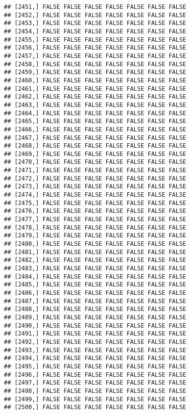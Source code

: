 \documentclass[
]{article}
\begin{document}
\begin{verbatim}
## [2451,] FALSE FALSE FALSE FALSE FALSE FALSE FALSE
## [2452,] FALSE FALSE FALSE FALSE FALSE FALSE FALSE
## [2453,] FALSE FALSE FALSE FALSE FALSE FALSE FALSE
## [2454,] FALSE FALSE FALSE FALSE FALSE FALSE FALSE
## [2455,] FALSE FALSE FALSE FALSE FALSE FALSE FALSE
## [2456,] FALSE FALSE FALSE FALSE FALSE FALSE FALSE
## [2457,] FALSE FALSE FALSE FALSE FALSE FALSE FALSE
## [2458,] FALSE FALSE FALSE FALSE FALSE FALSE FALSE
## [2459,] FALSE FALSE FALSE FALSE FALSE FALSE FALSE
## [2460,] FALSE FALSE FALSE FALSE FALSE FALSE FALSE
## [2461,] FALSE FALSE FALSE FALSE FALSE FALSE FALSE
## [2462,] FALSE FALSE FALSE FALSE FALSE FALSE FALSE
## [2463,] FALSE FALSE FALSE FALSE FALSE FALSE FALSE
## [2464,] FALSE FALSE FALSE FALSE FALSE FALSE FALSE
## [2465,] FALSE FALSE FALSE FALSE FALSE FALSE FALSE
## [2466,] FALSE FALSE FALSE FALSE FALSE FALSE FALSE
## [2467,] FALSE FALSE FALSE FALSE FALSE FALSE FALSE
## [2468,] FALSE FALSE FALSE FALSE FALSE FALSE FALSE
## [2469,] FALSE FALSE FALSE FALSE FALSE FALSE FALSE
## [2470,] FALSE FALSE FALSE FALSE FALSE FALSE FALSE
## [2471,] FALSE FALSE FALSE FALSE FALSE FALSE FALSE
## [2472,] FALSE FALSE FALSE FALSE FALSE FALSE FALSE
## [2473,] FALSE FALSE FALSE FALSE FALSE FALSE FALSE
## [2474,] FALSE FALSE FALSE FALSE FALSE FALSE FALSE
## [2475,] FALSE FALSE FALSE FALSE FALSE FALSE FALSE
## [2476,] FALSE FALSE FALSE FALSE FALSE FALSE FALSE
## [2477,] FALSE FALSE FALSE FALSE FALSE FALSE FALSE
## [2478,] FALSE FALSE FALSE FALSE FALSE FALSE FALSE
## [2479,] FALSE FALSE FALSE FALSE FALSE FALSE FALSE
## [2480,] FALSE FALSE FALSE FALSE FALSE FALSE FALSE
## [2481,] FALSE FALSE FALSE FALSE FALSE FALSE FALSE
## [2482,] FALSE FALSE FALSE FALSE FALSE FALSE FALSE
## [2483,] FALSE FALSE FALSE FALSE FALSE FALSE FALSE
## [2484,] FALSE FALSE FALSE FALSE FALSE FALSE FALSE
## [2485,] FALSE FALSE FALSE FALSE FALSE FALSE FALSE
## [2486,] FALSE FALSE FALSE FALSE FALSE FALSE FALSE
## [2487,] FALSE FALSE FALSE FALSE FALSE FALSE FALSE
## [2488,] FALSE FALSE FALSE FALSE FALSE FALSE FALSE
## [2489,] FALSE FALSE FALSE FALSE FALSE FALSE FALSE
## [2490,] FALSE FALSE FALSE FALSE FALSE FALSE FALSE
## [2491,] FALSE FALSE FALSE FALSE FALSE FALSE FALSE
## [2492,] FALSE FALSE FALSE FALSE FALSE FALSE FALSE
## [2493,] FALSE FALSE FALSE FALSE FALSE FALSE FALSE
## [2494,] FALSE FALSE FALSE FALSE FALSE FALSE FALSE
## [2495,] FALSE FALSE FALSE FALSE FALSE FALSE FALSE
## [2496,] FALSE FALSE FALSE FALSE FALSE FALSE FALSE
## [2497,] FALSE FALSE FALSE FALSE FALSE FALSE FALSE
## [2498,] FALSE FALSE FALSE FALSE FALSE FALSE FALSE
## [2499,] FALSE FALSE FALSE FALSE FALSE FALSE FALSE
## [2500,] FALSE FALSE FALSE FALSE FALSE FALSE FALSE

\end{verbatim}
\end{document}
